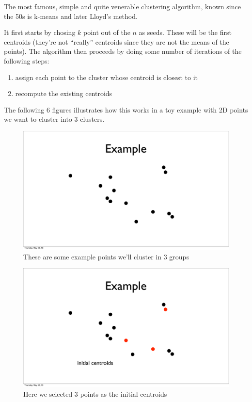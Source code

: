 \documentclass{article}
\begin{document}
The most famous, simple and quite venerable clustering algorithm, known since the 50s
is k-means and later Lloyd's method.

It first starts by chosing $k$ point out of the $n$ as seeds. These will be the
first centroids (they're not ``really'' centroids since they are not the means
of the points).
The algorithm then proceeds by doing some number of iterations of the following
steps:
\begin{enumerate}
    \item assign each point to the cluster whose centroid is closest to it
    \item recompute the existing centroids
\end{enumerate}
The following 6 figures illustrates how this works in a toy example with 2D
points we want to cluster into 3 clusters.

\begin{figure}[H]
    \caption{These are some example points we'll cluster in 3 groups}
    \includegraphics[scale=0.4]{kmeans-points-pre.pdf}
\end{figure}

\begin{figure}[H]
    \caption{Here we selected 3 points as the initial centroids}
    \includegraphics[scale=0.4]{kmeans-points-init.pdf}
\end{figure}
\end{document}
